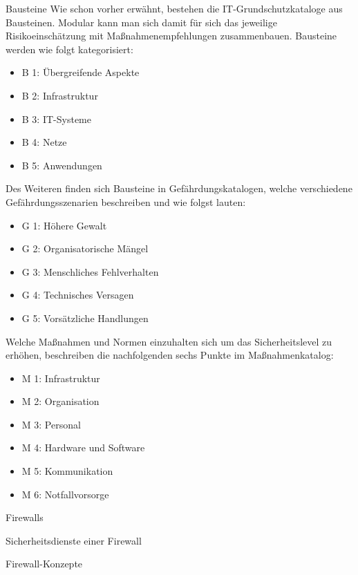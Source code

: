  \label{Bausteine}
 \begin{section} {Bausteine}
 	Wie schon vorher erwähnt, bestehen die IT-Grundschutzkataloge aus Bausteinen.
 	Modular kann man sich damit für sich das jeweilige Risikoeinschätzung mit Maßnahmenempfehlungen  zusammenbauen.
 	Bausteine werden wie folgt kategorisiert:
 	
 	\begin{itemize}
 		\item B 1: Übergreifende Aspekte
 		\item B 2: Infrastruktur
 		\item B 3: IT-Systeme
 		\item B 4: Netze
 		\item B 5: Anwendungen
 	\end{itemize}
 	
 	Des Weiteren finden sich Bausteine in Gefährdungskatalogen, welche verschiedene Gefährdungsszenarien 
 	beschreiben und wie folgst lauten:
 	
 	\begin{itemize}
 		\item G 1: Höhere Gewalt
 		\item G 2: Organisatorische Mängel
 		\item G 3: Menschliches Fehlverhalten
 		\item G 4: Technisches Versagen
 		\item G 5: Vorsätzliche Handlungen
 	\end{itemize}
 	
 	Welche Maßnahmen und Normen einzuhalten sich um das Sicherheitslevel zu erhöhen, beschreiben die 
 	nachfolgenden sechs Punkte im Maßnahmenkatalog: 
 	\begin{itemize}
 		\item M 1: Infrastruktur
 		\item M 2: Organisation
 		\item M 3: Personal
 		\item M 4: Hardware und Software
 		\item M 5: Kommunikation
 		\item M 6: Notfallvorsorge
 	\end{itemize}
 	
 \end{section}

 \pagebreak
 \label{Firewalls}
 \begin{section}{Firewalls}

  \label{Sicherheitsdienste einer Firewall}
  \begin{subsection}{Sicherheitsdienste einer Firewall}
  \end{subsection}
 
  \label{Firewall-Konzepte}
  \begin{subsection}{Firewall-Konzepte}
  \end{subsection}
 \end{section}
\pagebreak

